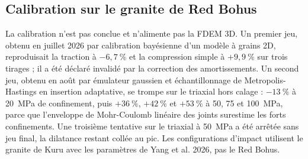 \subsection{Calibration sur le granite de Red Bohus}

La calibration n'est pas conclue et n'alimente pas la FDEM 3D. Un premier jeu, obtenu en juillet 2026 par calibration bayésienne d'un modèle à grains 2D, reproduisait la traction à $-6{,}7~\%$ et la compression simple à $+9{,}9~\%$ sur trois tirages ; il a été déclaré invalidé par la correction des amortissements. Un second jeu, obtenu en août par émulateur gaussien et échantillonnage de Metropolis-Hastings en insertion adaptative, se trompe sur le triaxial hors calage : $-13~\%$ à 20~MPa de confinement, puis $+36~\%$, $+42~\%$ et $+53~\%$ à 50, 75 et 100~MPa, parce que l'enveloppe de Mohr-Coulomb linéaire des joints surestime les forts confinements. Une troisième tentative sur le triaxial à 50~MPa a été arrêtée sans jeu final, la dilatance restant collée au pic. Les configurations d'impact utilisent le granite de Kuru avec les paramètres de Yang et al. 2026, pas le Red Bohus.
